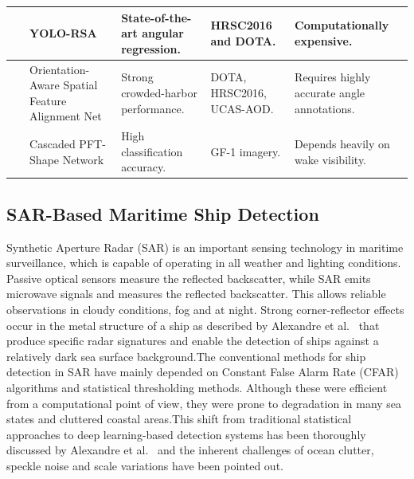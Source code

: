\begin{table}[htbp]
{\begin{tabular}{|p{0.8cm}|p{3.3cm}|p{3.3cm}|p{3.2cm}|p{4.6cm}|}
~\cite{jmse12040603}   
    & YOLO-RSA 
    & State-of-the-art angular regression.
    & HRSC2016 and DOTA. 
    & Computationally expensive. \\
\hline

~\cite{xu2025robust}  
    & Orientation-Aware Spatial Feature Alignment Net 
    & Strong crowded-harbor performance. 
    & DOTA, HRSC2016, UCAS-AOD. 
    & Requires highly accurate angle annotations. \\
\hline

~\cite{Liu31122023}   
    & Cascaded PFT-Shape Network 
    & High classification accuracy. 
    & GF-1 imagery. 
    & Depends heavily on wake visibility. \\
\hline

\end{tabular}}
\end{table}

\FloatBarrier

\subsection{SAR-Based Maritime Ship Detection}

Synthetic Aperture Radar (SAR) is an important sensing technology in maritime surveillance, which is capable of operating in all weather and lighting conditions. Passive optical sensors measure the reflected backscatter, while SAR emits microwave signals and measures the reflected backscatter. This allows reliable observations in cloudy conditions, fog and at night. Strong corner-reflector effects occur in the metal structure of a ship as described by Alexandre et al.~\cite{10620443} that produce specific radar signatures and enable the detection of ships against a relatively dark sea surface background.The conventional methods for ship detection in SAR have mainly depended on Constant False Alarm Rate (CFAR) algorithms and statistical thresholding methods. Although these were efficient from a computational point of view, they were prone to degradation in many sea states and cluttered coastal areas.This shift from traditional statistical approaches to deep learning-based detection systems has been thoroughly discussed by Alexandre et al.~\cite{10620443} and the inherent challenges of ocean clutter, speckle noise and scale variations have been pointed out.\\

